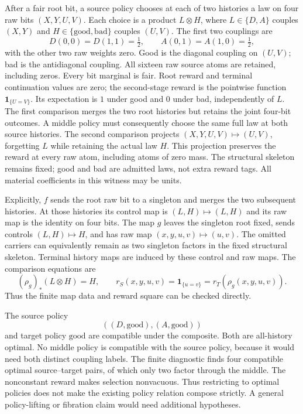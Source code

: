 \documentclass[11pt]{article}
\theoremstyle{definition}
\begin{document}
After a fair root bit, a source policy chooses at each of two histories a
law on four raw bits \((X,Y,U,V)\). Each choice is a product
\(L\otimes H\), where \(L\in\{D,A\}\) couples \((X,Y)\) and
\(H\in\{\mathrm{good},\mathrm{bad}\}\) couples \((U,V)\).
The first two couplings are
\[
 D(0,0)=D(1,1)=\tfrac12,\qquad
 A(0,1)=A(1,0)=\tfrac12,
\]
with the other two raw weights zero. Good is the diagonal coupling on
\((U,V)\); bad is the antidiagonal coupling. All sixteen raw source
atoms are retained, including zeros. Every bit marginal is fair.
Root reward and terminal continuation values are zero; the second-stage
reward is the pointwise function \(\mathbf1_{\{U=V\}}\). Its expectation
is \(1\) under good and \(0\) under bad, independently of \(L\).
The first comparison merges the two root histories but retains the joint
four-bit outcomes. A middle policy must consequently choose the same full
law at both source histories. The second comparison projects
\((X,Y,U,V)\mapsto(U,V)\), forgetting \(L\) while retaining the actual
law \(H\). This projection preserves the reward at every raw atom,
including atoms of zero mass. The structural skeleton remains fixed;
good and bad are admitted laws, not extra reward tags. All material
coefficients in this witness may be units.

Explicitly, \(f\) sends the root raw bit to a singleton and merges the two
subsequent histories. At those histories its control map is
\((L,H)\mapsto(L,H)\) and its raw map is the identity on four bits.
The map \(g\) leaves the singleton root fixed, sends controls
\((L,H)\mapsto H\), and has raw map
\((x,y,u,v)\mapsto(u,v)\). The omitted carriers can equivalently remain
as two singleton factors in the fixed structural skeleton. Terminal
history maps are induced by these control and raw maps. The comparison
equations are
\[
 (\rho_g)_*(L\otimes H)=H,\qquad
 r_S(x,y,u,v)=\mathbf1_{\{u=v\}}=r_T(\rho_g(x,y,u,v)).
\]
Thus the finite map data and reward square can be checked directly.

The source policy
\[
 ((D,\mathrm{good}),(A,\mathrm{good}))
\]
and target policy \(\mathrm{good}\) are compatible under the composite.
Both are all-history optimal. No middle policy is compatible with the
source policy, because it would need both distinct coupling labels.
The finite diagnostic finds four compatible optimal source--target pairs,
of which only two factor through the middle. The nonconstant reward makes
selection nonvacuous. Thus restricting to optimal policies does not make
the existing policy relation compose strictly. A general policy-lifting
or fibration claim would need additional hypotheses.
\end{document}
